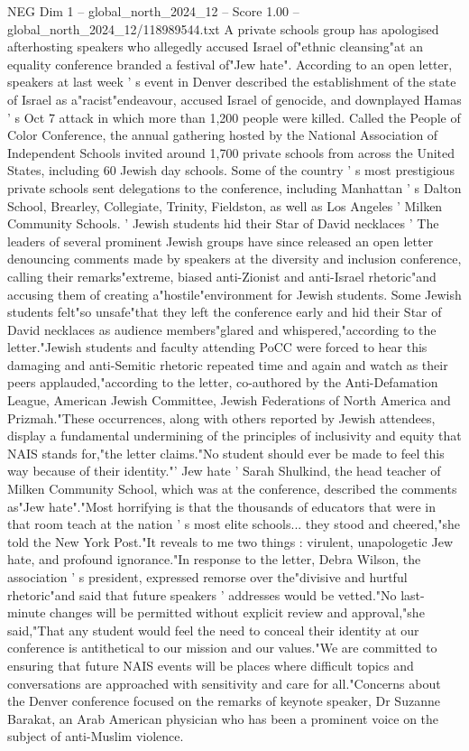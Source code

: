 \begin{textsample}{NEG Dim 1 – global\_north\_2024\_12 – Score 1.00 – global\_north\_2024\_12/118989544.txt}  \label{ex:f1_neg_222}
A private schools group has apologised afterhosting speakers who allegedly accused Israel of"ethnic cleansing"at an equality conference branded a festival of"Jew hate".
According to an open letter, speakers at last week ' s event in Denver described the establishment of the state of Israel as a"racist"endeavour, accused Israel of genocide, and downplayed Hamas ' s Oct 7 attack in which more than 1,200 people were killed.
Called the People of Color Conference, the annual gathering hosted by the National Association of Independent Schools invited around 1,700 private schools from across the United States, including 60 Jewish day schools.
Some of the country ' s most prestigious private schools sent delegations to the conference, including Manhattan ' s Dalton School, Brearley, Collegiate, Trinity, Fieldston, as well as Los Angeles ' Milken Community Schools. ' Jewish students hid their Star of David necklaces ' The leaders of several prominent Jewish groups have since released an open letter denouncing comments made by speakers at the diversity and inclusion conference, calling their remarks"extreme, biased anti-Zionist and anti-Israel rhetoric"and accusing them of creating a"hostile"environment for Jewish students.
Some Jewish students felt"so unsafe"that they left the conference early and hid their Star of David necklaces as audience members"glared and whispered,"according to the letter."Jewish students and faculty attending PoCC were forced to hear this damaging and anti-Semitic rhetoric repeated time and again and watch as their peers applauded,"according to the letter, co-authored by the Anti-Defamation League, American Jewish Committee, Jewish Federations of North America and Prizmah."These occurrences, along with others reported by Jewish attendees, display a fundamental undermining of the principles of inclusivity and equity that NAIS stands for,"the letter claims."No student should ever be made to feel this way because of their identity."' Jew hate ' Sarah Shulkind, the head teacher of Milken Community School, which was at the conference, described the comments as"Jew hate"."Most horrifying is that the thousands of educators that were in that room teach at the nation ' s most elite schools... they stood and cheered,"she told the New York Post."It reveals to me two things : virulent, unapologetic Jew hate, and profound ignorance."In response to the letter, Debra Wilson, the association ' s president, expressed remorse over the"divisive and hurtful rhetoric"and said that future speakers ' addresses would be vetted."No last-minute changes will be permitted without explicit review and approval,"she said,"That any student would feel the need to conceal their identity at our conference is antithetical to our mission and our values."We are committed to ensuring that future NAIS events will be places where difficult topics and conversations are approached with sensitivity and care for all."Concerns about the Denver conference focused on the remarks of keynote speaker, Dr Suzanne Barakat, an Arab American physician who has been a prominent voice on the subject of anti-Muslim violence.

\end{textsample}
